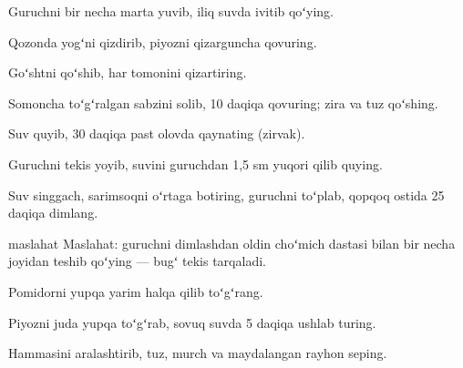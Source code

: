 \begin{retsept}
\tayyorlash
\item Guruchni bir necha marta yuvib, iliq suvda ivitib qoʻying.
\item Qozonda yogʻni qizdirib, piyozni qizarguncha qovuring.
\item Goʻshtni qoʻshib, har tomonini qizartiring.
\item Somoncha toʻgʻralgan sabzini solib, 10 daqiqa qovuring; zira va tuz qoʻshing.
\item Suv quyib, 30 daqiqa past olovda qaynating (zirvak).
\item Guruchni tekis yoyib, suvini guruchdan 1,5 sm yuqori qilib quying.
\item Suv singgach, sarimsoqni oʻrtaga botiring, guruchni toʻplab, qopqoq ostida 25 daqiqa dimlang.
\end{retsept}

\begin{uslub}{maslahat}
Maslahat: guruchni dimlashdan oldin choʻmich dastasi bilan bir necha joyidan teshib qoʻying — bugʻ tekis tarqaladi.
\end{uslub}

\begin{retsept}
\tayyorlash
\item Pomidorni yupqa yarim halqa qilib toʻgʻrang.
\item Piyozni juda yupqa toʻgʻrab, sovuq suvda 5 daqiqa ushlab turing.
\item Hammasini aralashtirib, tuz, murch va maydalangan rayhon seping.
\end{retsept}


